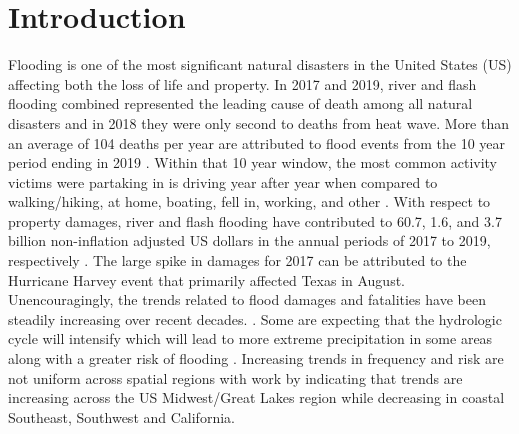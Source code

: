 \section{Introduction}

Flooding is one of the most significant natural disasters in the United States (US) affecting both the loss of life and property. 
In 2017 and 2019, river and flash flooding combined represented the leading cause of death among all natural disasters and in 2018 they were only second to deaths from heat wave\cite{national_weather_service_2020,national_weather_service_2019,national_weather_service_2018}. 
More than an average of 104 deaths per year are attributed to flood events from the 10 year period ending in 2019 \cite{us_department_of_commerce_2020}. 
Within that 10 year window, the most common activity victims were partaking in is driving year after year when compared to walking/hiking, at home, boating, fell in, working, and other \cite{us_department_of_commerce_2020}.
With respect to property damages, river and flash flooding have contributed to 60.7, 1.6, and 3.7 billion non-inflation adjusted US dollars in the annual periods of 2017 to 2019, respectively \cite{national_weather_service_2020,national_weather_service_2019,national_weather_service_2018}. 
The large spike in damages for 2017 can be attributed to the Hurricane Harvey event that primarily affected Texas in August. 
Unencouragingly, the trends related to flood damages and fatalities have been steadily increasing over recent decades. \cite{mallakpour2015changing,downton2005reanalysis,kunkel1999temporal,pielke2000precipitation,corringham2019effect}. 
Some are expecting that the hydrologic cycle will intensify which will lead to more extreme precipitation in some areas along with a greater risk of flooding \cite{tabari2020climate,milly2002increasing,wing2018estimates}. 
Increasing trends in frequency and risk are not uniform across spatial regions with work by  indicating that trends are increasing across the US Midwest/Great Lakes region while decreasing in coastal Southeast, Southwest and California.


